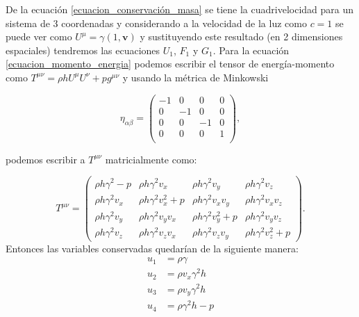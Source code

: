 \documentclass[12pt,a4paper]{book}
\begin{document}
\noindent De la ecuación \ref{ecuacion_conservación_masa} se tiene la cuadrivelocidad para un sistema de 
3 coordenadas y considerando a la velocidad de la luz como $c=1$ se puede ver como $U^{\mu}=\gamma \left( 1, \textbf{v}\right)$ y sustituyendo este resultado (en 2 dimensiones espaciales) tendremos las ecuaciones 
$U_1$, $F_1$ y $G_1$. Para la ecuación \ref{ecuacion_momento_energia} podemos escribir el tensor de energía-momento como $T^{\mu \nu} = \rho h U^{\mu} U^{\nu} + pg^{\mu \nu}$ y usando la métrica de Minkowski

\begin{equation}
\eta_{\alpha \beta}= 
\begin{pmatrix}
 -1 & 0 & 0 & 0 \\
 0 & -1 & 0 & 0 \\
 0 & 0 & -1 & 0 \\
 0 & 0 & 0 & 1 \\ 
\end{pmatrix},
\end{equation}

\noindent podemos escribir a $T^{\mu \nu}$ matricialmente como:

\begin{equation}
T^{\mu \nu} =
\begin{pmatrix}
\rho h \gamma^2-p & \rho h \gamma^2 v_{x}  & \rho h \gamma^2 v_{y} & \rho h \gamma^2 v_{z} \\

\rho h \gamma^2 v_{x} & \rho h \gamma^2 v_{x}^{2}+p & \rho h \gamma^2 v_{x}v_{y} &  \rho h \gamma^2 v_{x}v_{z} \\

\rho h \gamma^2 v_{y} & \rho h \gamma^2 v_{y}v_{x} & \rho h \gamma^2 v_{y}^{2}+p & \rho h \gamma^2 v_{y}v_{z}\\

\rho h \gamma^2 v_{z} & \rho h \gamma^2 v_{z}v_{x} & \rho h \gamma^2 v_{z}v_{y} & \rho h \gamma^2 v_{z}^2 + p

\end{pmatrix} .
\end{equation}
Entonces las variables conservadas quedarían de la siguiente manera:
\begin{align}
u_{1}& = \rho \gamma \\ 
u_{2}& = \rho v_{x} \gamma^{2} h \\ 
u_{3}& = \rho v_{y} \gamma^{2} h \\ 
u_{4}& = \rho \gamma^{2} h - p 
\end{align}
\end{document}
